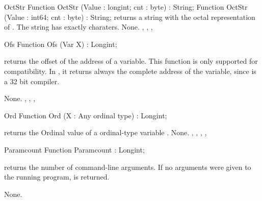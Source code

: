 
\begin{function}{OctStr}
\Declaration
Function OctStr (Value : longint; cnt : byte) : String;
Function OctStr (Value : int64; cnt : byte) : String;
\Description
{} returns a string with the octal representation
of . The string has exactly  charaters.
\Errors
None.
\SeeAlso
{}, , , 
\end{function}


\begin{function}{Ofs}
\Declaration
Function Ofs (Var X) : Longint;

\Description
{} returns the offset of the address of a variable.
This function is only supported for compatibility. In \fpc, it
returns always the complete address of the variable, since \fpc is a 32 bit
compiler.

\Errors
None.
\SeeAlso
{}, , , 
\end{function}


\begin{function}{Ord}
\Declaration
Function Ord (X : Any ordinal type) : Longint;

\Description
{} returns the Ordinal value of a ordinal-type variable .
\Errors
None.
\SeeAlso
{}, , , , 
\end{function}


\begin{function}{Paramcount}
\Declaration
Function Paramcount  : Longint;

\Description
{} returns the number of command-line arguments. If no
arguments were given to the running program,  is returned.

\Errors
None.
\SeeAlso
{}
\end{function}


